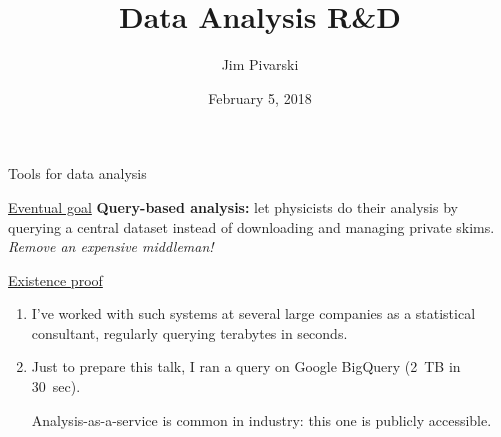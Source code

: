 \documentclass[aspectratio=169]{beamer}
\title[2018-02-05-cmsoffline-oamap]{Data Analysis R\&D}
\author{Jim Pivarski}
\institute{Princeton University -- DIANA-HEP}
\date{February 5, 2018}
\begin{document}

\begin{frame}
  \titlepage
\end{frame}




\begin{frame}{Tools for data analysis}
\vspace{0.5 cm}
\begin{block}{\underline{Eventual goal}}
\vspace{0.15 cm}
{\bf Query-based analysis:} let physicists do their analysis by querying a central dataset instead of downloading and managing private skims. {\it Remove an expensive middleman!}
\end{block}

\vspace{0.5 cm}
\begin{block}{\underline{Existence proof}}
\begin{enumerate}
\item I've worked with such systems at several large companies as a statistical consultant, regularly querying terabytes in seconds.
\item Just to prepare this talk, I ran a query on Google BigQuery (2~TB in 30~sec).

Analysis-as-a-service is common in industry: this one is publicly accessible.
\end{enumerate}
\end{block}
\end{frame}
\end{document}

